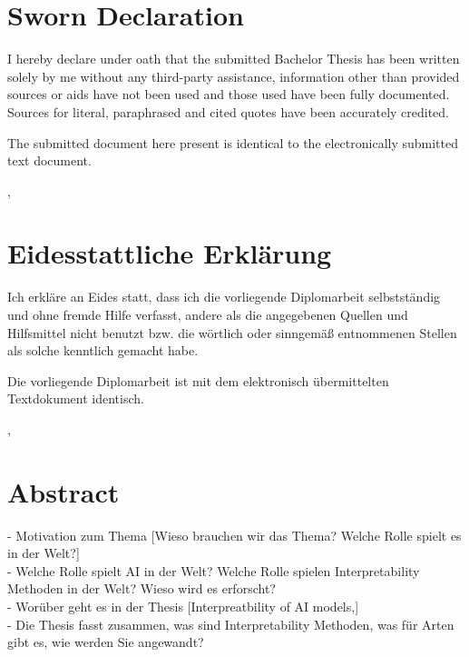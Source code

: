 
	\ifeng \chapter*{Sworn Declaration}
	I hereby declare under oath that the submitted Bachelor Thesis has been written solely by me without any third-party assistance, information other than provided sources or aids have not been used and those used have been fully documented. Sources for literal, paraphrased and cited quotes have been accurately credited.

	The submitted document here present is identical to the electronically submitted text document.

	\vskip1cm
	\place, \date

	\else \chapter*{Eidesstattliche Erklärung}
	Ich erkläre an Eides statt, dass ich die vorliegende Diplomarbeit selbstständig und ohne fremde Hilfe verfasst, andere als die angegebenen Quellen und Hilfsmittel nicht benutzt bzw. die wörtlich oder sinngemäß entnommenen Stellen als solche kenntlich gemacht habe.

	Die vorliegende Diplomarbeit ist mit dem elektronisch übermittelten Textdokument identisch.

	\vskip1cm
	\place, \date
	\fi

		\chapter*{Abstract}

- Motivation zum Thema [Wieso brauchen wir das Thema? Welche Rolle spielt es in der Welt?]\\
- Welche Rolle spielt AI in der Welt? Welche Rolle spielen Interpretability Methoden in der Welt? Wieso wird es erforscht?\\
- Worüber geht es in der Thesis [Interpreatbility of AI models,]\\
- Die Thesis fasst zusammen, was sind Interpretability Methoden, was für Arten gibt es, wie werden Sie angewandt?\\

